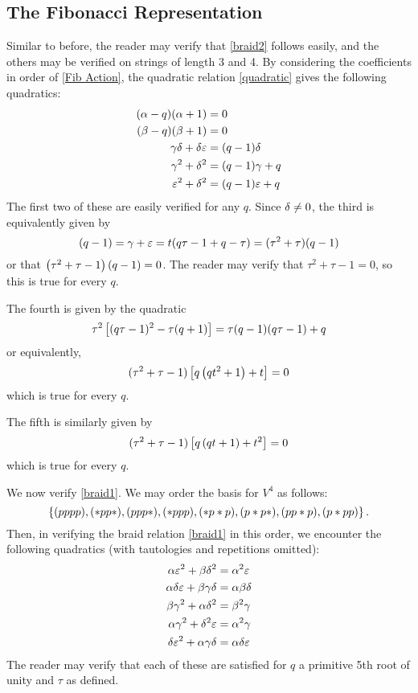 \documentclass{amsart}
\begin{document}
\subsection{The Fibonacci Representation} 
\label{Fib Relations}
Similar to before, the reader may verify that \eqref{braid2} follows easily, and the others may be verified on strings of length 3 and 4.
By considering the coefficients in order of \eqref{Fib Action}, the quadratic relation \eqref{quadratic} gives the following quadratics:
\begin{equation}
  \begin{split}
    (\alpha - q)(\alpha + 1) &= 0\\
    (\beta - q)(\beta + 1) &= 0\\
    \gamma\delta + \delta\varepsilon &= (q-1)\delta\\
    \gamma^2 + \delta^2 &= (q -1)\gamma + q\\
    \varepsilon^2 + \delta^2 &= (q -1)\varepsilon + q
  \end{split}
\end{equation}
The first two of these are easily verified for any $q$.
Since $\delta \neq 0$, the third is equivalently given by
\[
  (q - 1) = \gamma + \varepsilon = t(q\tau - 1 + q - \tau) = (\tau^2 + \tau)(q - 1)
\]
or that $\left( \tau^2 + \tau - 1 \right)(q-1) = 0$.
The reader may verify that $\tau^2 + \tau - 1 = 0$, so this is true for every $q$.

The fourth is given by the quadratic
\[
  \tau^2\left[ (q\tau-1)^2 - \tau(q+1) \right] = \tau(q-1)(q\tau - 1) + q
\]
or equivalently,
\[
  (\tau^2 + \tau - 1)\left[ q\left( qt^2 + 1 \right) + t \right] = 0
\]
which is true for every $q$.

The fifth is similarly given by
\[
  (\tau^2 + \tau - 1)\left[ q\left( qt + 1 \right) + t^2 \right] = 0 
\]
which is true for every $q$.

\vspace{7pt}
We now verify \eqref{braid1}.
We may order the basis for $V^4$ as follows:
\[
  \left\{ (pppp),(*pp*),(ppp*),(*ppp),(*p*p),(p*p*),(pp*p),(p*pp) \right\}.
\]
Then, in verifying the braid relation \eqref{braid1} in this order, we encounter the following quadratics (with tautologies and repetitions omitted):
\begin{align*}
    \alpha\varepsilon^2 + \beta\delta^2 &= \alpha^2 \varepsilon\\
    \alpha\delta\varepsilon + \beta\gamma\delta &= \alpha\beta\delta\\
    \beta\gamma^2 + \alpha\delta^2 &= \beta^2\gamma\\
    \alpha\gamma^2 + \delta^2\varepsilon &= \alpha^2\gamma\\
    \delta\varepsilon^2 + \alpha\gamma\delta &= \alpha\delta\varepsilon
\end{align*}
The reader may verify that each of these are satisfied for $q$ a primitive 5th root of unity and $\tau$ as defined.
\end{document}
